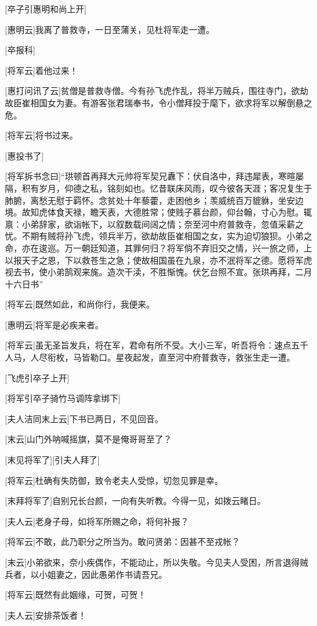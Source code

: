 \documentclass{book}
\begin{document}
[卒子引惠明和尚上开]

[惠明云]我离了普救寺，一日至蒲关，见杜将军走一遭。

[卒报科]

[将军云]着他过来！

[惠打问讯了云]贫僧是普救寺僧。今有孙飞虎作乱，将半万贼兵，围往寺门，欲劫故臣崔相国女为妻。有游客张君瑞奉书，令小僧拜投于麾下，欲求将军以解倒悬之危。

[将军云]将书过来。

[惠投书了]

[将军拆书念曰]``珙顿首再拜大元帅将军契兄纛下：伏自洛中，拜违犀表，寒暄屡隔，积有岁月，仰德之私，铭刻如也。忆昔联床风雨，叹今彼各天涯；客况复生于肺腑，离愁无慰于羁怀。念贫处十年藜藿，走困他乡；羡威统百万貔貅，坐安边境。故知虎体食天禄，瞻天表，大德胜常；使贱子慕台颜，仰台翰，寸心为慰。辄禀：小弟辞家，欲诣帐下，以叙数载间阔之情；奈至河中府普救寺，忽值采薪之忧。不期有贼将孙飞虎，领兵半万，欲劫故臣崔相国之女，实为迫切狼狈。小弟之命，亦在逡巡。万一朝廷知道，其罪何归？将军倘不弃旧交之情，兴一旅之师，上以报天子之恩，下以救苍生之急；使故相国虽在九泉，亦不泯将军之德。愿将军虎视去书，使小弟鹄观来旄。造次干渎，不胜惭愧。伏乞台照不宣。张珙再拜，二月十六日书''

[将军云]既然如此，和尚你行，我便来。

[惠明云]将军是必疾来者。

[将军云]虽无圣旨发兵，将在军，君命有所不受。大小三军，听吾将令：速点五千人马，人尽衔枚，马皆勒口。星夜起发，直至河中府普救寺，救张生走一遭。

[飞虎引卒子上开]

[将军引卒子骑竹马调阵拿绑下]

[夫人洁同末上云]下书已两日，不见回音。

[末云]山门外呐喊摇旗，莫不是俺哥哥至了？

[末见将军了][引夫人拜了]

[将军云]杜确有失防御，致令老夫人受惊，切忽见罪是幸。

[末拜将军了]自别兄长台颜，一向有失听教。今得一见，如拨云睹日。

[夫人云]老身子母，如将军所赐之命，将何补报？

[将军云]不敢，此乃职分之所当为。敢问贤弟：因甚不至戎帐？

[末云]小弟欲来，奈小疾偶作，不能动止，所以失敬。今见夫人受困，所言退得贼兵者，以小姐妻之，因此愚弟作书请吾兄。

[将军云]既然有此姻缘，可贺，可贺！

[夫人云]安排茶饭者！
\end{document}
